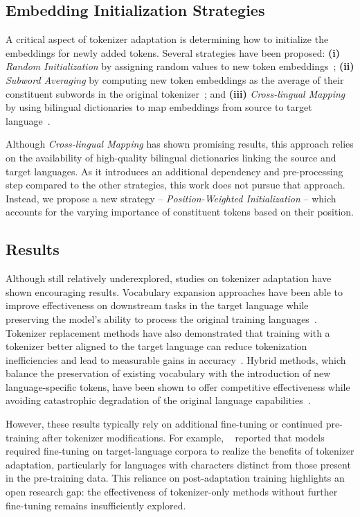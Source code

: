 \subsection{Embedding Initialization Strategies}
A critical aspect of tokenizer adaptation is determining how to initialize the embeddings for newly added tokens. Several strategies have been proposed: \textbf{(i)} \textit{Random Initialization} by assigning random values to new token embeddings~\cite{koto2021indobertweet}; \textbf{(ii)} \textit{Subword Averaging} by computing new token embeddings as the average of their constituent subwords in the original tokenizer~\cite{gu2024retok}; and \textbf{(iii)} \textit{Cross-lingual Mapping} by using bilingual dictionaries to map embeddings from source to target language~\cite{artetxe2018robust}.

Although \textit{Cross-lingual Mapping} has shown promising results, this approach relies on the availability of high-quality bilingual dictionaries linking the source and target languages. As it introduces an additional dependency and pre-processing step  compared to the other strategies, this work does not pursue that approach. Instead, we propose a new strategy -- \textit{Position-Weighted Initialization} -- which accounts for the varying importance of constituent tokens based on their position.

\subsection{Results}

Although still relatively underexplored, studies on tokenizer adaptation have shown encouraging results. Vocabulary expansion approaches have been able to improve effectiveness on downstream tasks in the target language while preserving the model’s ability to process the original training languages~\cite{fernandez2022fine}. Tokenizer replacement methods have also demonstrated that training with a tokenizer better aligned to the target language can reduce tokenization inefficiencies and lead to measurable gains in accuracy~\cite{rust2020good}. Hybrid methods, which balance the preservation of existing vocabulary with the introduction of new language-specific tokens, have been shown to offer competitive effectiveness while avoiding catastrophic degradation of the original language capabilities~\cite{csaki2023efficiently}.  

However, these results typically rely on additional fine-tuning or continued pre-training after tokenizer modifications. For example, ~\citet{csaki2023efficiently} reported that models required fine-tuning on target-language corpora to realize the benefits of tokenizer adaptation, particularly for languages with characters distinct from those present in the pre-training data. This reliance on post-adaptation training highlights an open research gap: the effectiveness of tokenizer-only methods without further fine-tuning remains insufficiently explored.  

